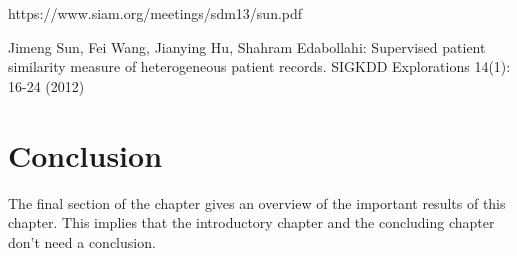 https://www.siam.org/meetings/sdm13/sun.pdf

Jimeng Sun, Fei Wang, Jianying Hu, Shahram Edabollahi: Supervised patient similarity measure of
heterogeneous patient records. SIGKDD Explorations 14(1): 16-24 (2012)


\section{Conclusion}
The final section of the chapter gives an overview of the important results
of this chapter. This implies that the introductory chapter and the
concluding chapter don't need a conclusion.



